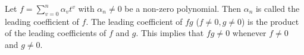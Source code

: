 Let $f = \sum_{v=0}^{n} \alpha_v t^v$ with $\alpha_n \neq 0$ be a non-zero polynomial. Then $\alpha_n$ is called the leading coefficient of $f$. The leading coefficient of $fg$ ($f \neq 0, g \neq 0$) is the product of the leading coefficients of $f$ and $g$. This implies that $fg \neq 0$ whenever $f \neq 0$ and $g \neq 0$.
